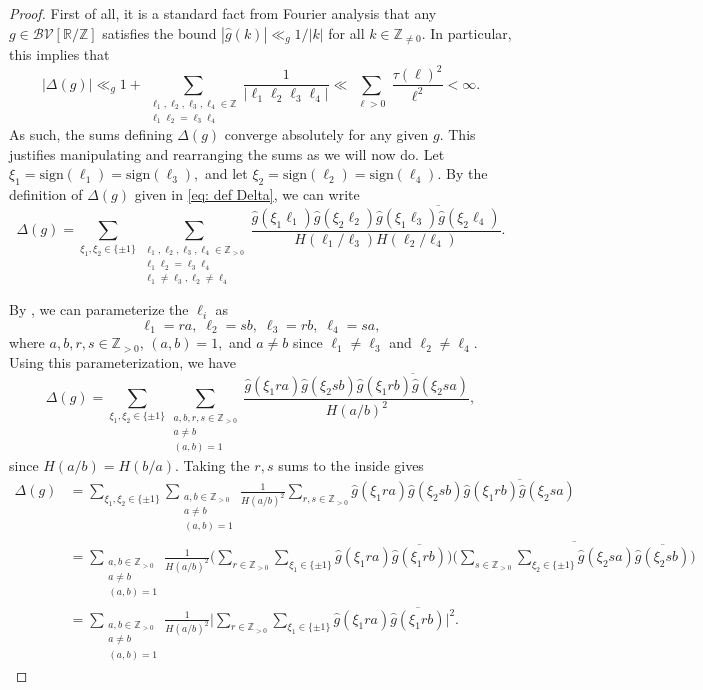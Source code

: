 \documentclass[12pt]{amsart}
\numberwithin{equation}{section}
\theoremstyle{plain}
\theoremstyle{definition}
\renewcommand{\l}{\ell}
\newcommand{\Z}{\mathbb{Z}}
\newcommand{\R}{\mathbb{R}}
\newcommand{\CB}{\mathcal{B}}
\newcommand{\CV}{\mathcal{V}}
\begin{document}
\begin{proof}
	First of all, it is a standard fact from Fourier analysis that any $g \in \CB\CV[\R/\Z]$ satisfies the bound $|\hat{g}(k)| \ll_g 1/|k|$ for all $k \in \Z_{\ne 0}$. In particular, this implies that 
	$$|\Delta(g)| \ll_g 1+ \sum_{\substack{\l_1,\l_2, \l_3,\l_4 \in \Z \\ \l_1\l_2 = \l_3\l_4}} \frac{1}{|\l_1\l_2\l_3\l_4|} \ll \sum_{\substack{\l > 0 }} \frac{\tau(\l)^2}{\l^2} < \infty.$$
	As such, the sums defining $\Delta(g)$ converge absolutely for any given $g$. This justifies manipulating and rearranging the sums as we will now do. Let $\xi_1 = \text{sign}(\l_1) = \text{sign}(\l_3),$ and let $\xi_2 = \text{sign}(\l_2) = \text{sign}(\l_4).$ By the definition of $\Delta(g)$ given in \eqref{eq: def Delta}, we can write
	$$\Delta(g) = \sum_{\xi_1,\xi_2 \in \{\pm 1\}}\sum_{\substack{\l_1,\l_2,\l_3,\l_4 \in \Z_{>0} \\ \l_1\l_2 = \l_3\l_4 \\ \l_1 \ne \l_3, \l_2 \ne \l_4}}\frac{\hat{g}(\xi_1\l_1)\hat{g}(\xi_2\l_2) \overline{\hat{g}(\xi_1\l_3)\hat{g}(\xi_2\l_4)}}{H(\l_1/\l_3)H(\l_2/\l_4)}. $$
	
	By , we can parameterize the $\l_i$ as
	$$\l_1 = ra, \; \l_2 = sb, \; \l_3 = rb, \; \l_4 = sa,$$
	where $a,b,r,s \in \Z_{>0}$, $(a,b) = 1,$ and $a \ne b$ since $\l_1 \ne \l_3$ and $\l_2 \ne \l_4$. Using this parameterization, we have
	$$\Delta(g) = \sum_{\xi_1,\xi_2 \in \{\pm 1\}}\sum_{\substack{a,b,r,s \in \Z_{>0} \\ a \ne b \\ (a,b) = 1}}\frac{\hat{g}(\xi_1ra)\hat{g}(\xi_2sb) \overline{\hat{g}(\xi_1rb)\hat{g}(\xi_2sa)}}{H(a/b)^2}, $$
	since $H(a/b)=H(b/a)$. Taking the $r,s$ sums to the inside gives
	\begin{align*}
		\Delta(g) &= \sum_{\xi_1,\xi_2 \in \{\pm 1\}}\sum_{\substack{a,b \in \Z_{>0} \\ a \ne b \\ (a,b) = 1}}\frac{1}{H(a/b)^2} \sum_{r,s \in \Z_{>0}}\hat{g}(\xi_1ra)\hat{g}(\xi_2sb) \overline{\hat{g}(\xi_1rb)\hat{g}(\xi_2sa)} \\
		&=\sum_{\substack{a,b \in \Z_{>0} \\ a \ne b \\ (a,b) = 1}}\frac{1}{H(a/b)^2} \bigg(\sum_{r \in \Z_{>0}} \sum_{\xi_1 \in \{\pm 1\}}\hat{g}(\xi_1ra)\overline{\hat{g}(\xi_1rb)} \bigg)\overline{\bigg(\sum_{s \in \Z_{>0}} \sum_{\xi_2 \in \{\pm 1\}}\hat{g}(\xi_2 sa)\overline{\hat{g}(\xi_2 sb)} \bigg)}\\
		&=\sum_{\substack{a,b \in \Z_{>0} \\ a \ne b \\ (a,b) = 1}}\frac{1}{H(a/b)^2} \bigg|\sum_{r \in \Z_{>0}} \sum_{\xi_1 \in \{\pm 1\}}\hat{g}(\xi_1ra)\overline{\hat{g}(\xi_1rb)} \bigg|^2.
	\end{align*}
	

\end{proof}
\end{document}
